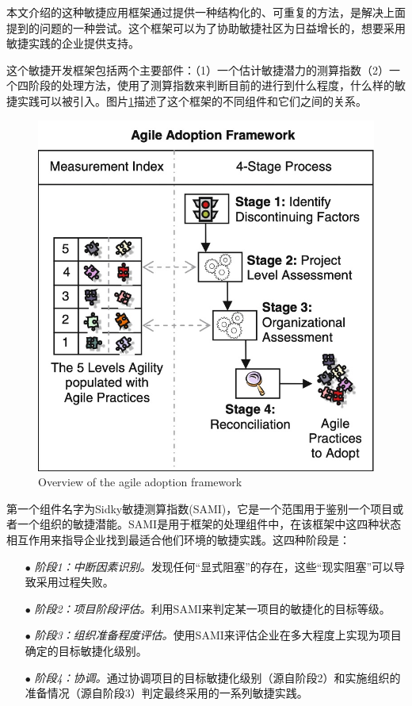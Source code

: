 \documentclass[twocolumn]{svjour3}[]
\begin{document}
本文介绍的这种敏捷应用框架通过提供一种结构化的、可重复的方法，是解决上面提到的问题的一种尝试。这个框架可以为了协助敏捷社区为日益增长的，想要采用敏捷实践的企业提供支持。

这个敏捷开发框架包括两个主要部件：（1）一个估计敏捷潜力的测算指数（2）一个四阶段的处理方法，使用了测算指数来判断目前的进行到什么程度，什么样的敏捷实践可以被引入。图片\ref{overview}描述了这个框架的不同组件和它们之间的关系。

\begin{figure} [htb]
    \centering
    \includegraphics[width=1.0\linewidth]{img/overview.jpg}
    \caption{Overview of the agile adoption framework}
    \label{overview}
\end{figure}

第一个组件名字为Sidky敏捷测算指数(SAMI)，它是一个范围用于鉴别一个项目或者一个组织的敏捷潜能。SAMI是用于框架的处理组件中，在该框架中这四种状态相互作用来指导企业找到最适合他们环境的敏捷实践。这四种阶段是：

\begin{itemize}
    \item[$\bullet$] \textit{阶段1：中断因素识别。}发现任何“显式阻塞”的存在，这些“现实阻塞”可以导致采用过程失败。
    \item[$\bullet$] \textit{阶段2：项目阶段评估。}利用SAMI来判定某一项目的敏捷化的目标等级。
    \item[$\bullet$] \textit{阶段3：组织准备程度评估。}使用SAMI来评估企业在多大程度上实现为项目确定的目标敏捷化级别。
    \item[$\bullet$] \textit{阶段4：协调。}通过协调项目的目标敏捷化级别（源自阶段2）和实施组织的准备情况（源自阶段3）判定最终采用的一系列敏捷实践。
\end{itemize}
\end{document}
